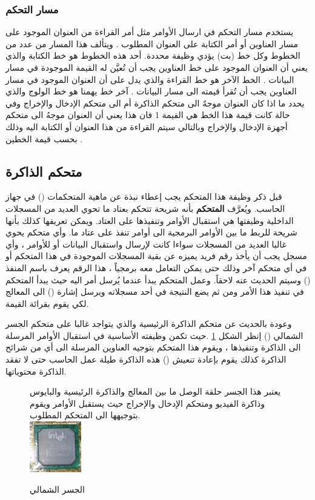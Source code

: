 \documentclass[document.tex]{subfiles}
\begin{document}
\subsubsection{مسار التحكم }
يستخدم مسار التحكم في ارسال الأوامر مثل أمر القراءة من العنوان الموجود على مسار العناوين أو أمر الكتابة على العنوان المطلوب . ويتألف هذا المسار من عدد من الخطوط وكل خط (بت) يؤدي وظيفة محددة. أحد هذه الخطوط هو خط الكتابة  والذي يعني أن العنوان الموجود على خط العناوين يجب أن تُعيَّن له القيمة الموجودة في مسار البيانات . الخط الآخر هو خط القراءة  والذي يدل على أن العنوان الموجود في مسار العناوين يجب أن تُقرأ قيمته الى مسار البيانات . آخر خط يهمنا هو خط الولوج  والذي يحدد ما اذا كان العنوان موجهٌ الى متحكم الذاكرة أم الى متحكم  الإدخال والإخراج وفي حالة كانت قيمة هذا الخط هي القيمة 1 فان هذا يعني أن العنوان موجهُ الى متحكم أجهزة الإدخال والإخراج وبالتالي سيتم القراءة من هذا العنوان أو الكتابة اليه وذلك بحسب قيمة الخطين .

\subsection{متحكم الذاكرة}
قبل ذكر وظيفة هذا المتحكم يجب إعطاء نبذة عن ماهية المتحكمات () في جهاز الحاسب. ويُعرَّف \textbf{المتحكم} بأنه شريحة تتحكم بعتاد ما تحوي العديد من المسجلات الداخلية وظيفتها هي استقبال الأوامر وتنفيذها على العتاد. ويمكن تعريفها كذلك بأنها شريحة للربط ما بين الأوامر البرمجية الى أوامر تنفذ على عتاد ما. وأي متحكم يحوي غالبا العديد من المسجلات سواءا كانت لإرسال واستقبال البيانات أو للأوامر ، وأي مسجل يجب أن يأخذ رقم فريد يميزه عن بقية المسجلات الموجودة في هذا المتحكم أو في أي متحكم آخر وذلك حتى يمكن التعامل معه برمجياً ، هذا الرقم يعرف باسم المنفذ () وسيتم الحديث عنه لاحقاً. وعمل المتحكم يبدأ عندما يُرسل أمر اليه حيث يبدأ المتحكم في تنفيذ هذا الأمر ومن ثم يضع النتيجة في أحد مسجلاته ويرسل إشارة () الى المعالج لكي يقوم بقرائة القيمة.

وعودة بالحديث عن متحكم الذاكرة الرئيسية والذي يتواجد غالبا على متحكم الجسر الشمالي () إنظر الشكل \ref{fig:nbridge} .حيث تكمن وظيفته الأساسية في استقبال الأوامر المرسلة الى الذاكرة وتنفيذها ، ويقوم هذا المتحكم بتوجيه العناوين المرسلة الى أي من شرائح الذاكرة كذلك يقوم بإعادة تنعيش () هذه الذاكرة طيلة عمل الحاسب حتى لا تفقد الذاكرة محتوياتها.

\begin{figure}[h!]
  \caption{الجسر الشمالي}
 {يعتبر هذا الجسر حلقة الوصل ما بين المعالج والذاكرة الرئيسية والبايوس وذاكرة الفيديو ومتحكم الإدخال والإخراج حيث يستقبل الأوامر ويقوم بتوجيهها الى المتحكم المطلوب.}
\\
  \centering
   \includegraphics[width=0.2\textwidth]{../img/nbridge}
  \label{fig:nbridge} 
\end{figure}
\end{document}
